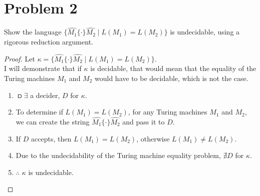 \documentclass{article}
\begin{document}
\section*{Problem 2}
Show the language $\{ \hat{M_1}\{\cdot\}\hat{M_2} \mid L(M_1) = L(M_2) \}$ is undecidable, using a rigorous reduction argument.
\begin{shaded}
  \begin{proof}
    Let $\kappa = \{ \hat{M_1}\{\cdot\}\hat{M_2} \mid L(M_1) = L(M_2) \}$. \\
    I will demonstrate that if $\kappa$ is decidable, that would mean that the equality of the Turing machines $M_1$ and $M_2$ would have to be decidable, which is not the case. \\
    \begin{enumerate}
      \item $\csup \exists$ a decider, $D$ for $\kappa$. 
      \item To determine if $L(M_1) = L(M_2)$, for any Turing machines $M_1$ and $M_2$, we can create the string $\hat{M_1} \{\cdot\} \hat{M_2}$ and pass it to $D$.
      \item If $D$ accepts, then $L(M_1) = L(M_2)$, otherwise $L(M_1) \neq L(M_2)$.
      \item Due to the undecidability of the Turing machine equality problem, $\nexists D$ for $\kappa$.
      \item $\therefore$ $\kappa$ is undecidable.
    \end{enumerate}
  \end{proof}
\end{shaded}
\end{document}

